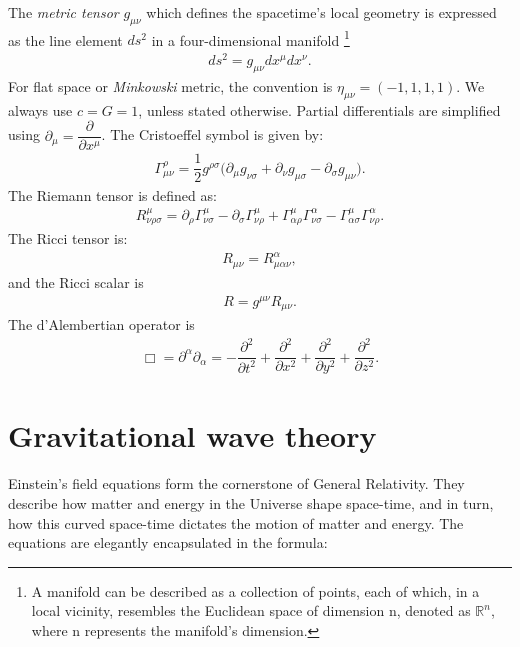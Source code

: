 The \textit{metric tensor} $g_{\mu\nu}$ which defines the spacetime's local geometry is expressed as the line element $ds^2$ in a four-dimensional manifold \footnote{A manifold can be described as a collection of points, each of which, in a local vicinity, resembles the Euclidean space of dimension n, denoted as $\mathbb{R}^n$, where n represents the manifold's dimension.}
\begin{align}
    ds^2 = g_{\mu\nu}dx^{\mu}dx^{\nu}.
\end{align}
For flat space or \textit{Minkowski} metric, the convention is $\eta_{\mu\nu} = (-1, 1, 1, 1)$. We always use $c = G = 1$, unless stated otherwise. Partial differentials are simplified using $\partial_{\mu} = \dfrac{\partial}{\partial x^{\mu}}$.
The Cristoeffel symbol is given by:
\begin{align}
    \Gamma^{\rho}_{\mu\nu} = \dfrac{1}{2}g^{\rho\sigma}\big(\partial_{\mu}g_{\nu\sigma} + \partial_{\nu}g_{\mu\sigma} - \partial_{\sigma}g_{\mu\nu} \big).
\end{align}
The Riemann tensor is defined as:
\begin{align}
    R^{\mu}_{\nu\rho\sigma} = \partial_{\rho}\Gamma^{\mu}_{\nu\sigma} - \partial_{\sigma}\Gamma^{\mu}_{\nu\rho} + \Gamma^{\mu}_{\alpha\rho}\Gamma^{\alpha}_{\nu\sigma} - \Gamma_{\alpha\sigma}^{\mu}\Gamma^{\alpha}_{\nu\rho}.
\end{align}
The Ricci tensor is:
\begin{align}
    R_{\mu\nu} = R^{\alpha}_{\mu\alpha\nu},
\end{align}
and the Ricci scalar is 
\begin{align}
    R = g^{\mu\nu}R_{\mu\nu}.
\end{align}
The d'Alembertian operator is 
\begin{align}
    \Box = \partial^{\alpha}\partial_{\alpha} = -\dfrac{\partial^2}{\partial t^2} + \dfrac{\partial^2}{\partial x^2} + \dfrac{\partial^2}{\partial y^2} + \dfrac{\partial^2}{\partial z^2}.
\end{align}

\section{Gravitational wave theory}
Einstein's field equations form the cornerstone of General Relativity. They describe how matter and energy in the Universe shape space-time, and in turn, how this curved space-time dictates the motion of matter and energy. The equations are elegantly encapsulated in the formula:

